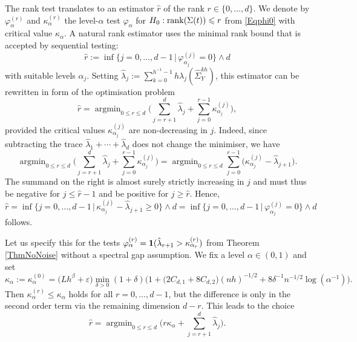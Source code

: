 \documentclass[preprint,aos]{imsart}
\numberwithin{equation}{section}
\theoremstyle{remark}
\DeclareMathOperator{\argmin}{argmin}\DeclareMathOperator{\argmax}{argmax}
\providecommand{\eps}{\varepsilon}
\renewcommand{\phi}{\varphi}
\renewcommand{\le}{\leqslant}
\renewcommand{\ge}{\geqslant}
\begin{document}
The rank test translates to an estimator $\hat r$ of the rank $r\in\{0,\ldots,d\}$. %
We denote by $\phi_{\alpha}^{(r)}$ and $\kappa_{\alpha}^{(r)}$  the level-$\alpha$ test $\phi_{\alpha}$ for $H_0:\rank(\Sigma(t))\le r$ from \eqref{Eqphi0} with critical value $\kappa_{\alpha}$. A natural rank estimator uses the minimal rank bound that is accepted by sequential testing:
\begin{equation}\label{EqDefhatr} \hat r:=\inf\{j=0,\ldots,d-1\,|\,\phi_{\alpha_j}^{(j)}=0\}\wedge d
\end{equation}
with suitable levels $\alpha_j$. Setting $\hat\lambda_j:=\sum_{k=0}^{h^{-1}-1}h\lambda_j(\hat\Sigma_Y^{kh})$, this estimator can be rewritten in form of the optimisation problem
\[ \hat r=\argmin_{0\le r\le d}\Big(\sum_{j=r+1}^d \hat\lambda_j+\sum_{j=0}^{r-1} \kappa_{\alpha_j}^{(j)}\Big),\]
provided the critical values $\kappa_{\alpha_j}^{(j)}$ are non-decreasing in $j$. Indeed, since subtracting the trace  $\hat\lambda_1+\cdots+\hat\lambda_d$ does not change the minimiser, we have
\begin{equation}\label{EqRankCrit} \argmin_{0\le r\le d}\Big(\sum_{j=r+1}^d \hat\lambda_j+\sum_{j=0}^{r-1} \kappa_{\alpha_j}^{(j)}\Big)=\argmin_{0\le r\le d}\sum_{j=0}^{r-1} \big(\kappa_{\alpha_j}^{(j)}-\hat\lambda_{j+1}\big).
\end{equation}
The summand on the right is almost surely strictly increasing in $j$ and must thus be  negative for $j\le \hat r-1$ and be positive for $j\ge \hat r$. Hence,
\[ \hat r=\inf\big\{j=0,\ldots,d-1\,\big|\,\kappa_{\alpha_j}^{(j)}-\hat\lambda_{j+1}\ge 0 \big\}\wedge d=\inf\{j=0,\ldots,d-1\,|\,\phi_{\alpha_j}^{(j)}=0\}\wedge d
\]
follows.

Let us specify this for the tests $\phi_\alpha^{(r)}={\bf 1}(\hat\lambda_{r+1}>\kappa_{\alpha_r}^{(r)})$ from Theorem \ref{ThmNoNoise} without a spectral gap assumption. We fix a level $\alpha\in(0,1)$ and set
\[ \kappa_\alpha:=\kappa_\alpha^{(0)}=\big(Lh^\beta+\eps\big)\min_{\delta>0}(1+\delta)\Big( 1
  +\big(2C_{d,1}+8C_{d,2}\big)(nh)^{-1/2}+
 8\delta^{-1}n^{-1/2}\log(\alpha^{-1})\Big).
\]
Then $\kappa_\alpha^{(r)}\le \kappa_\alpha$ holds for all $r=0,\ldots,d-1$, but the difference is only in the second order term via the remaining dimension $d-r$. This leads to the choice
\begin{equation}\label{Eqhatr}
\hat r=\argmin_{0\le r\le d}\Big(r\kappa_\alpha+\sum_{j=r+1}^d \hat\lambda_j\Big).
\end{equation}
\end{document}
